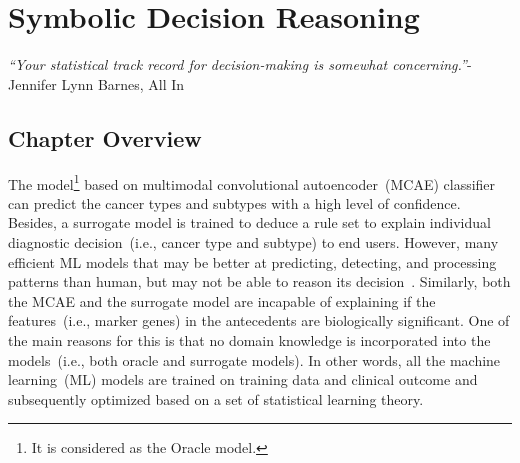 \chapter{Symbolic Decision Reasoning}\label{chapter:nsr}
\textit{``Your statistical track record for decision-making is somewhat concerning.''}- Jennifer Lynn Barnes, All In\\

\section{Chapter Overview}
The model\footnote{It is considered as the Oracle model.} based on multimodal convolutional autoencoder~(MCAE) classifier can predict the cancer types and subtypes with a high level of confidence. Besides, a surrogate model is trained to deduce a rule set to explain individual diagnostic decision~(i.e., cancer type and subtype) to end users. However, many efficient ML models that may be better at predicting, detecting, and processing patterns than human, but may not be able to reason its decision~\cite{miller2018explanation}.
Similarly, both the MCAE and the surrogate model are incapable of explaining if the features~(i.e., marker genes) in the antecedents are biologically significant. One of the main reasons for this is that no domain knowledge is incorporated into the models~(i.e., both oracle and surrogate models). In other words, all the machine learning~(ML) models are trained on training data and clinical outcome and subsequently optimized based on a set of statistical learning theory. %

